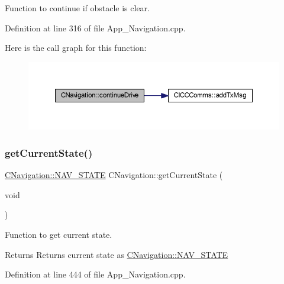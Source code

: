Function to continue if obstacle is clear. 



Definition at line 316 of file App\+\_\+\+Navigation.\+cpp.

Here is the call graph for this function\+:
\nopagebreak
\begin{figure}[H]
\begin{center}
\leavevmode
\includegraphics[width=350pt]{class_c_navigation_ab3d29f3ab4a8a922f5af439f6d78aded_cgraph}
\end{center}
\end{figure}
\mbox{\label{class_c_navigation_a42982842952ac5340b54f43a661673f4}} 
\subsubsection{\texorpdfstring{get\+Current\+State()}{getCurrentState()}}
{\footnotesize\ttfamily \mbox{\hyperlink{class_c_navigation_add9fc966c7604990edf5c2a2e0eba32c}{C\+Navigation\+::\+N\+A\+V\+\_\+\+S\+T\+A\+TE}} C\+Navigation\+::get\+Current\+State (\begin{DoxyParamCaption}\item[{void}]{ }\end{DoxyParamCaption})\hspace{0.3cm}{\ttfamily [virtual]}}



Function to get current state. 

\begin{DoxyReturn}{Returns}
Returns current state as \mbox{\hyperlink{class_c_navigation_add9fc966c7604990edf5c2a2e0eba32c}{C\+Navigation\+::\+N\+A\+V\+\_\+\+S\+T\+A\+TE}} 
\end{DoxyReturn}


Definition at line 444 of file App\+\_\+\+Navigation.\+cpp.

\mbox{\label{class_c_navigation_afef253f37646558a755d956ecf2fc6e9}} 
